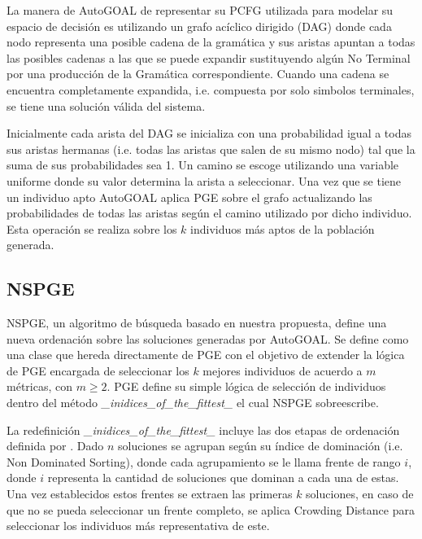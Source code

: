 La manera de AutoGOAL de representar su PCFG utilizada para modelar su espacio de decisi\'on es utilizando un grafo ac\'iclico dirigido (DAG) donde cada nodo representa una posible cadena de la gram\'atica y sus aristas apuntan a todas las posibles cadenas a las que se puede expandir sustituyendo alg\'un No Terminal por una producci\'on de la Gram\'atica correspondiente. Cuando una cadena se encuentra completamente expandida, i.e. compuesta por solo simbolos terminales, se tiene una soluci\'on v\'alida del sistema. 

Inicialmente cada arista del DAG se inicializa con una probabilidad igual a todas sus aristas hermanas (i.e. todas las aristas que salen de su mismo nodo) tal que la suma de sus probabilidades sea 1. Un camino se escoge utilizando una variable uniforme donde su valor determina la arista a seleccionar.
Una vez que se tiene un individuo apto AutoGOAL aplica PGE sobre el grafo actualizando las probabilidades de todas las aristas seg\'un el camino utilizado por dicho individuo. Esta operaci\'on se realiza sobre los $k$ individuos m\'as aptos de la poblaci\'on generada. %

\subsection{NSPGE}
NSPGE, un algoritmo de b\'usqueda basado en nuestra propuesta, define una nueva ordenaci\'on sobre las soluciones generadas por AutoGOAL. Se define como una clase que hereda directamente de PGE con el objetivo de extender la l\'ogica de PGE encargada de seleccionar los $k$ mejores individuos de acuerdo a $m$ m\'etricas, con $m \ge 2$. PGE define su simple l\'ogica de selecci\'on de individuos dentro del m\'etodo \textit{\_inidices\_of\_the\_fittest\_} el cual NSPGE sobreescribe.

La redefinici\'on \textit{\_inidices\_of\_the\_fittest\_} incluye las dos etapas de ordenaci\'on definida por \cite{deb2002fast}. Dado $n$ soluciones se  agrupan seg\'un su \'indice de dominaci\'on (i.e. Non Dominated Sorting), donde cada agrupamiento se le llama frente de rango $i$, donde $i$ representa la cantidad de soluciones que dominan a cada una de estas. Una vez establecidos estos frentes se extraen las primeras $k$ soluciones, en caso de que no se pueda seleccionar un frente completo, se aplica Crowding Distance para seleccionar los individuos m\'as representativa de este.


